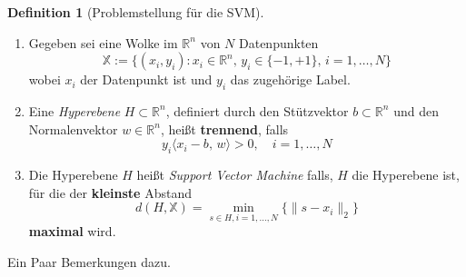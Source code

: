 \documentclass[
]{book}
\theoremstyle{definition}
\newtheorem{definition}{Definition}[chapter]
\theoremstyle{definition}
\theoremstyle{definition}
\theoremstyle{definition}
\theoremstyle{remark}
\begin{document}
\begin{definition}[Problemstellung für die SVM]
\protect\hypertarget{def:def-svm-problem}{}\label{def:def-svm-problem}\leavevmode

\begin{enumerate}
\def\labelenumi{\arabic{enumi}.}
\item
  Gegeben sei eine Wolke im \(\mathbb R^{n}\) von \(N\) Datenpunkten \[\mathbb X :=
  \bigl \{(x_i,y_i)\colon x_i \in \mathbb R^{n}, \, y_i\in \{-1,+1\}, \,
  i=1,\dotsc, N\bigr \}\] wobei \(x_i\) der Datenpunkt ist und \(y_i\) das
  zugehörige Label.
\item
  Eine \emph{Hyperebene} \(H\subset \mathbb R^{n}\), definiert durch den
  Stützvektor \(b\subset \mathbb R^{n}\) und den Normalenvektor \(w\in \mathbb R^{n}\), heißt \textbf{trennend}, falls
  \begin{equation}\label{eq:eqn-trennende-hyperebene}
  y_i\bigl \langle x_i-b, \, w\bigr\rangle  >0, \quad i=1,\dotsc,N
  \end{equation}
\item
  Die Hyperebene \(H\) heißt \emph{Support Vector Machine} falls, \(H\) die
  Hyperebene ist, für die der \textbf{kleinste} Abstand
  \[d(H, \mathbb X) = \min_{s\in H, i=1, \dotsc, N}\{\|s-x_i\|_2\}\]
  \textbf{maximal} wird.
\end{enumerate}

\end{definition}

Ein Paar Bemerkungen dazu.
\end{document}
